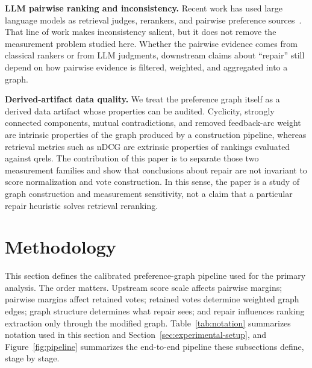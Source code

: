\documentclass[manuscript,anonymous,review]{acmart}
\begin{document}
\textbf{LLM pairwise ranking and inconsistency.} Recent work has used large
language models as retrieval judges, rerankers, and pairwise preference
sources~\cite{sun-etal-2023-chatgpt,qin-etal-2024-large}. That line of work
makes inconsistency salient, but it does not remove the measurement problem
studied here. Whether the pairwise evidence comes from classical rankers or
from LLM judgments, downstream claims about ``repair'' still depend on how
pairwise evidence is filtered, weighted, and aggregated into a graph.

\textbf{Derived-artifact data quality.} We treat the preference graph itself as
a derived data artifact whose properties can be audited. Cyclicity, strongly
connected components, mutual contradictions, and removed feedback-arc weight
are intrinsic properties of the graph produced by a construction pipeline,
whereas retrieval metrics such as nDCG are extrinsic properties of rankings
evaluated against qrels. The contribution of this paper is to separate those
two measurement families and show that conclusions about repair are not
invariant to score normalization and vote construction. In this sense, the
paper is a study of graph construction and measurement sensitivity, not a claim
that a particular repair heuristic solves retrieval reranking.

\section{Methodology}
\label{sec:methodology}

This section defines the calibrated preference-graph pipeline used for the
primary analysis. The order matters. Upstream score scale affects
pairwise margins; pairwise margins affect retained votes; retained votes
determine weighted graph edges; graph structure determines what repair sees;
and repair influences ranking extraction only through the modified graph.
Table~\ref{tab:notation} summarizes notation used in this section and
Section~\ref{sec:experimental-setup}, and Figure~\ref{fig:pipeline} summarizes
the end-to-end pipeline these subsections define, stage by stage.
\end{document}
